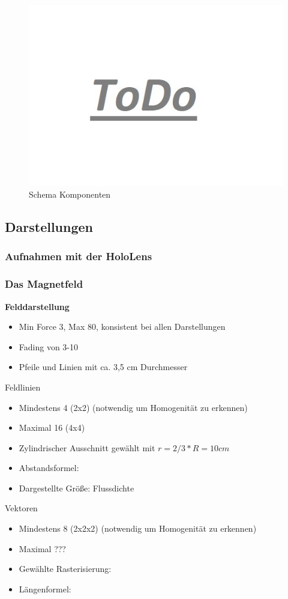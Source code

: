 \begin{figure}[h!]
	\centering
	\includegraphics[width=1\textwidth]{images/todo.jpg}
	\caption{Schema Komponenten}
	\label{img:components-schema}
\end{figure}





\subsection{Darstellungen}

\subsubsection{Aufnahmen mit der HoloLens}

\subsubsection{Das Magnetfeld}

\textbf{Felddarstellung}
\begin{itemize}
	\item Min Force 3, Max 80, konsistent bei allen Darstellungen
	\item Fading von 3-10
	\item Pfeile und Linien mit ca. 3,5 cm Durchmesser
\end{itemize}
Feldlinien
\begin{itemize}
	\item Mindestens 4 (2x2) (notwendig um Homogenität zu erkennen)
	\item Maximal 16 (4x4)
	\item Zylindrischer Ausschnitt gewählt mit $r=2/3 * R = 10 cm$
	\item Abstandsformel: 
	\item Dargestellte Größe: Flussdichte
\end{itemize}
Vektoren
\begin{itemize}
	\item Mindestens 8 (2x2x2) (notwendig um Homogenität zu erkennen)
	\item Maximal ???
	\item Gewählte Rasterisierung:
	\item Längenformel:
\end{itemize}

